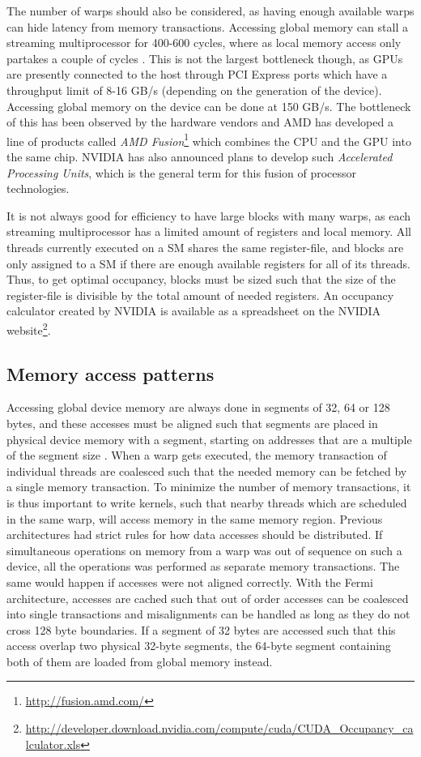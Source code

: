 The number of warps should also be considered, as having enough
available warps can hide latency from memory transactions. Accessing
global memory can stall a streaming multiprocessor for 400-600 cycles,
where as local memory access only partakes a couple of cycles
\cite{nvidia2009opencloptimization}. This is not the largest
bottleneck though, as GPUs are presently connected to the host through
PCI Express ports which have a throughput limit of 8-16 GB/s
(depending on the generation of the device). Accessing global memory
on the device can be done at 150 GB/s. The bottleneck of this has been
observed by the hardware vendors and AMD has developed a line of
products called \textit{AMD
  Fusion}\footnote{\url{http://fusion.amd.com/}} which combines the
CPU and the GPU into the same chip. NVIDIA has also announced plans to
develop such \textit{Accelerated Processing Units}, which is the
general term for this fusion of processor technologies.

It is not always good for efficiency to have large blocks with many
warps, as each streaming multiprocessor has a limited amount of
registers and local memory. All threads currently executed on a SM
shares the same register-file, and blocks are only assigned to a SM if
there are enough available registers for all of its threads. Thus, to
get optimal occupancy, blocks must be sized such that the size of the
register-file is divisible by the total amount of needed registers. An
occupancy calculator created by NVIDIA is available as a spreadsheet
on the NVIDIA
website\footnote{\url{http://developer.download.nvidia.com/compute/cuda/CUDA_Occupancy_calculator.xls}}.

\subsection{Memory access patterns}
Accessing global device memory are always done in segments of 32, 64
or 128 bytes, and these accesses must be aligned such that segments
are placed in physical device memory with a segment, starting on
addresses that are a multiple of the segment size
\cite{nvidia2010cudaguide}. When a warp gets executed, the memory
transaction of individual threads are coalesced such that the
needed memory can be fetched by a single memory transaction. To
minimize the number of memory transactions, it is thus important to
write kernels, such that nearby threads which are scheduled in the
same warp, will access memory in the same memory region. Previous
architectures had strict rules for how data accesses should be
distributed. If simultaneous operations on memory from a warp was out
of sequence on such a device, all the operations was performed as
separate memory transactions. The same would happen if accesses were
not aligned correctly. With the Fermi architecture, accesses are
cached such that out of order accesses can be coalesced into single
transactions and misalignments can be handled as long as they do not
cross 128 byte boundaries. If a segment of 32 bytes are accessed such
that this access overlap two physical 32-byte segments, the 64-byte
segment containing both of them are loaded from global memory instead.

